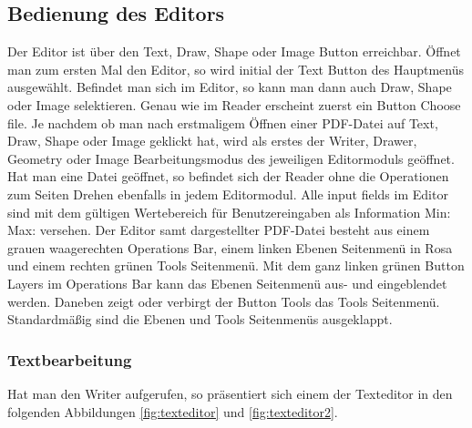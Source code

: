 \subsection{Bedienung des Editors}
Der Editor ist über den Text, Draw, Shape oder Image Button erreichbar. Öffnet man zum ersten Mal den Editor, so wird initial der Text Button des Hauptmenüs ausgewählt. Befindet man sich im Editor, so kann man dann auch Draw, Shape oder Image selektieren. Genau wie im Reader erscheint zuerst ein Button Choose file. Je nachdem ob man nach erstmaligem Öffnen einer PDF-Datei auf Text, Draw, Shape oder Image geklickt hat, wird als erstes der Writer, Drawer, Geometry oder Image Bearbeitungsmodus des jeweiligen Editormoduls geöffnet. Hat man eine Datei geöffnet, so befindet sich der Reader ohne die Operationen zum Seiten Drehen ebenfalls in jedem Editormodul. Alle input fields im Editor sind mit dem gültigen Wertebereich für Benutzereingaben als Information Min: Max: versehen. Der Editor samt dargestellter PDF-Datei besteht aus einem grauen waagerechten Operations Bar, einem linken Ebenen Seitenmenü in Rosa und einem rechten grünen Tools Seitenmenü. Mit dem ganz linken grünen Button Layers im Operations Bar kann das Ebenen Seitenmenü aus- und eingeblendet werden. Daneben zeigt oder verbirgt der Button Tools das Tools Seitenmenü. Standardmäßig sind die Ebenen und Tools Seitenmenüs ausgeklappt. 

\subsubsection{Textbearbeitung}
Hat man den Writer aufgerufen, so präsentiert sich einem der Texteditor in den folgenden Abbildungen \ref{fig:texteditor} und \ref{fig:texteditor2}.

